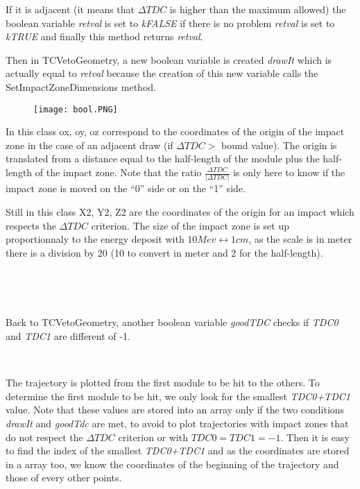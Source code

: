 \documentclass[12pt, a4paper]{article}
\begin{document}
 If it is adjacent (it means that $ \Delta TDC $ is higher than the maximum allowed) the boolean variable \emph{retval} is set to \emph{kFALSE} if there is no problem \emph{retval} is set to \emph{kTRUE} and finally this method returns \emph{retval}.
 
Then in TCVetoGeometry, a new boolean variable is created \emph{drawIt} which is actually equal to \emph{retval} because the creation of this new variable calls the SetImpactZoneDimensions method.

\begin{figure} [H]
\begin{center}
\texttt{[image: bool.PNG]}
\end{center}
\end{figure}


In this class ox, oy, oz correspond to the coordinates of the origin of the impact zone in the case of an adjacent draw (if $\Delta TDC >$ bound value). The origin is translated from a distance equal to the half-length of the module plus the half-length of the impact zone. Note that the ratio $\frac{\Delta TDC}{|\Delta TDC|}$ is only here to know if the impact zone is moved on the “0” side or on the “1” side.

Still in this class X2, Y2, Z2 are the coordinates of the origin for an impact which respects the $ \Delta TDC $ criterion. The size of the impact zone is set up proportionnaly to the energy deposit with $ 10Mev \leftrightarrow 1cm $, as the scale is in meter there is a division by 20 (10 to convert in meter and 2 for the half-length).

~

~


Back to TCVetoGeometry, another boolean variable \emph{goodTDC} checks if \emph{TDC0} and \emph{TDC1} are different of -1. 

~

The trajectory is plotted from the first module to be hit to the others. To determine the first module to be hit, we only look for the smallest \emph{TDC0+TDC1} value.  Note that these values are stored into an array only if the two conditions \emph{drawIt} and \emph{goodTdc} are met, to avoid to plot trajectories with impact zones that do not respect the $ \Delta TDC $ criterion or with $ TDC0=TDC1=-1 $. Then it is easy to find the index of the smallest \emph{TDC0+TDC1} and as the coordinates are stored in a array too, we know the coordinates of the beginning of the trajectory and those of every other points. 
\end{document}
